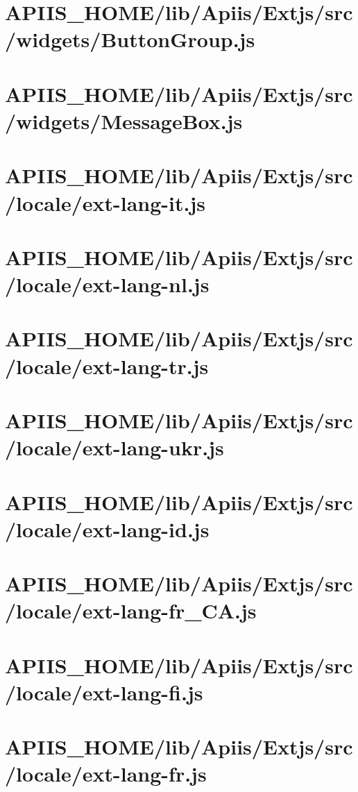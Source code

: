 \section{APIIS\_HOME/lib/Apiis/Extjs/src/widgets/ButtonGroup.js} 
\section{APIIS\_HOME/lib/Apiis/Extjs/src/widgets/MessageBox.js} 
\section{APIIS\_HOME/lib/Apiis/Extjs/src/locale/ext-lang-it.js} 
\section{APIIS\_HOME/lib/Apiis/Extjs/src/locale/ext-lang-nl.js} 
\section{APIIS\_HOME/lib/Apiis/Extjs/src/locale/ext-lang-tr.js} 
\section{APIIS\_HOME/lib/Apiis/Extjs/src/locale/ext-lang-ukr.js} 
\section{APIIS\_HOME/lib/Apiis/Extjs/src/locale/ext-lang-id.js} 
\section{APIIS\_HOME/lib/Apiis/Extjs/src/locale/ext-lang-fr\_CA.js} 
\section{APIIS\_HOME/lib/Apiis/Extjs/src/locale/ext-lang-fi.js} 
\section{APIIS\_HOME/lib/Apiis/Extjs/src/locale/ext-lang-fr.js} 
